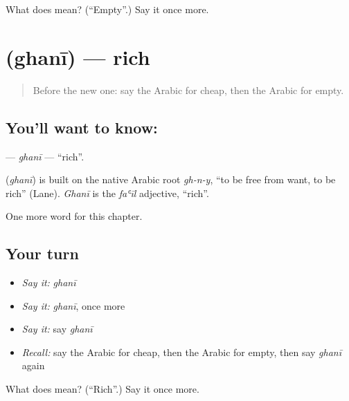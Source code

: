\begin{tcolorbox}[breakable,colback=teal!4,colframe=teal!35!black,title={Before you move on}]
What does  mean? (\textquotedblleft{}Empty\textquotedblright{}.) Say it once more.
\end{tcolorbox}
\section[\texorpdfstring{\ar{غني} (ghanī)}{غني (ghanī)}]{ (ghanī) — rich}

\label{lesson:AR-C84-ghani}



\begin{quote}
Before the new one: say the Arabic for cheap, then the Arabic for empty.
\end{quote}

\subsection*{You'll want to know: }
\textbf{} — \emph{ghanī} — \textquotedblleft{}rich\textquotedblright{}.

\begin{cousinweb}
\textbf{} (\emph{ghanī}) is built on the native Arabic root \emph{gh-n-y}, \textquotedblleft{}to be free from want, to be rich\textquotedblright{} (Lane). \emph{Ghanī} is the \emph{faʿīl} adjective, \textquotedblleft{}rich\textquotedblright{}.
\end{cousinweb}

\begin{grammarlens}[title={What you've built}]
One more word for this chapter.
\end{grammarlens}

\subsection*{Your turn}
\begin{itemize}
\raggedright
  \item \emph{Say it:} \emph{ghanī}
  \item \emph{Say it:} \emph{ghanī}, once more
  \item \emph{Say it:} say \emph{ghanī}
  \item \emph{Recall:} say the Arabic for cheap, then the Arabic for empty, then say \emph{ghanī} again
\end{itemize}

\begin{tcolorbox}[breakable,colback=teal!4,colframe=teal!35!black,title={Before you move on}]
What does  mean? (\textquotedblleft{}Rich\textquotedblright{}.) Say it once more.
\end{tcolorbox}
